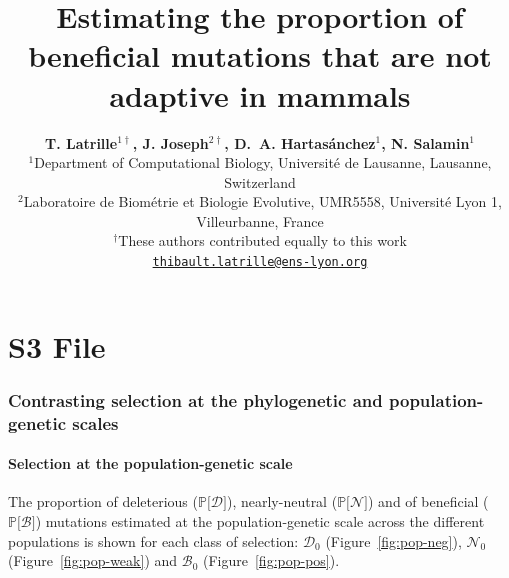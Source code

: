 \documentclass{article}
\title{\textbf{Estimating the proportion of beneficial mutations that are not adaptive in mammals}}
\author{
    \large
    \textbf{T. {Latrille}$^{1\dag}$\orcidlink{0000-0002-9643-4668}, J. {Joseph}$^{2\dag}$\orcidlink{0009-0002-1312-9930}, D.~A. {Hartasánchez}$^{1}$\orcidlink{0000-0003-2596-6883}, N. {Salamin}$^{1}$\orcidlink{0000-0002-3963-4954}}\\
    \scriptsize $^{1}$Department of Computational Biology, Université de Lausanne, Lausanne, Switzerland\\
    \scriptsize $^{2}$Laboratoire de Biométrie et Biologie Evolutive, UMR5558, Université Lyon 1, Villeurbanne, France \\
    \scriptsize $^{\dag}$These authors contributed equally to this work\\
    \normalsize \texttt{\href{mailto:thibault.latrille@ens-lyon.org}{thibault.latrille@ens-lyon.org}} \\
}
\date{}
\newcommand{\proba}{\mathbb{P}}
\newcommand{\SphyDel}{\mathcal{D}_0}
\newcommand{\SphyNeu}{\mathcal{N}_0}
\newcommand{\SphyBen}{\mathcal{B}_0}
\newcommand{\SpopDel}{\mathcal{D}}
\newcommand{\SpopNeu}{\mathcal{N}}
\newcommand{\SpopBen}{\mathcal{B}}
\newcommand{\ProbaPopDel}{\proba{[} \SpopDel]}
\newcommand{\ProbaPopNeu}{\proba{[} \SpopNeu ]}
\newcommand{\ProbaPopBen}{\proba{[} \SpopBen ]}
\begin{document}
    \maketitle
    \part*{S3 File}
    \vspace{-1em}
    \tableofcontents
    \listoffigures
    \clearpage

    \section{Contrasting selection at the phylogenetic and population-genetic scales}

    \subsection{Selection at the population-genetic scale}
    The proportion of deleterious ($\ProbaPopDel$), nearly-neutral ($\ProbaPopNeu$) and of beneficial ($\ProbaPopBen$) mutations estimated at the population-genetic scale across the different populations is shown for each class of selection:
    $\SphyDel$ (Figure~\ref{fig:pop-neg}), $\SphyNeu$ (Figure~\ref{fig:pop-weak}) and $\SphyBen$ (Figure~\ref{fig:pop-pos}).
\end{document}
